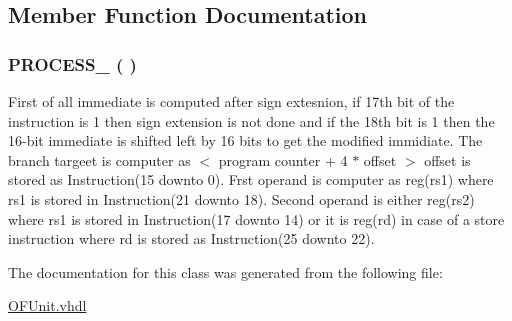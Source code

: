 \subsection{Member Function Documentation}
\hypertarget{class_o_f_unit_1_1_o_f_u_ad6cab3590f19d09760591444870d2e29}{
\subsubsection[{P\-R\-O\-C\-E\-S\-S\-\_\-3}]{\setlength{\rightskip}{0pt plus 5cm} {\bfseries \textcolor{vhdlchar}{ }} P\-R\-O\-C\-E\-S\-S\-\_ ( ) \hspace{0.3cm}{\ttfamily [Process]}}}\label{class_o_f_unit_1_1_o_f_u_ad6cab3590f19d09760591444870d2e29}
First of all immediate is computed after sign extesnion, if 17th bit of the instruction is 1 then sign extension is not done and if the 18th bit is 1 then the 16-\/bit immediate is shifted left by 16 bits to get the modified immidiate. The branch targeet is computer as $<$ program counter + 4 $\ast$ offset $>$ offset is stored as Instruction(15 downto 0). Frst operand is computer as reg(rs1) where rs1 is stored in Instruction(21 downto 18). Second operand is either reg(rs2) where rs1 is stored in Instruction(17 downto 14) or it is reg(rd) in case of a store instruction where rd is stored as Instruction(25 downto 22). 

The documentation for this class was generated from the following file\-:\begin{DoxyCompactItemize}
\item 
\hyperlink{_o_f_unit_8vhdl}{O\-F\-Unit.\-vhdl}\end{DoxyCompactItemize}
